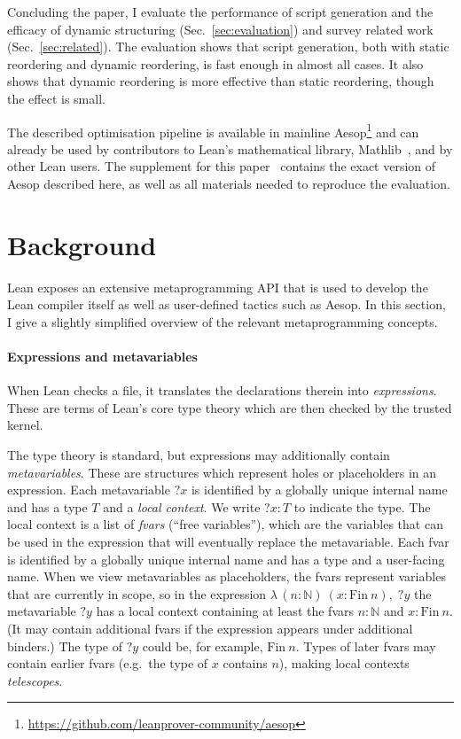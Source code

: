 \documentclass[sigplan,screen]{acmart}
\newcommand{\Lam}[2]{λ\,#1,\; #2}
\newcommand{\mvar}[1]{{?#1}}
\begin{document}
\medskip

Concluding the paper, I evaluate the performance of script generation and the efficacy of dynamic structuring (Sec.~\ref{sec:evaluation}) and survey related work (Sec.~\ref{sec:related}).
The evaluation shows that script generation, both with static reordering and dynamic reordering, is fast enough in almost all cases.
It also shows that dynamic reordering is more effective than static reordering, though the effect is small.

The described optimisation pipeline is available in mainline Aesop\footnote{\url{https://github.com/leanprover-community/aesop}} and can already be used by contributors to Lean's mathematical library, Mathlib~\cite{Mathlib}, and by other Lean users.
The supplement for this paper~\cite{supplement} contains the exact version of Aesop described here, as well as all materials needed to reproduce the evaluation.

\section{Background}%
\label{sec:background}

Lean exposes an extensive metaprogramming API that is used to develop the Lean compiler itself as well as user-defined tactics such as Aesop.
In this section, I give a slightly simplified overview of the relevant metaprogramming concepts.

\paragraph{Expressions and metavariables}
When Lean checks a file, it translates the declarations therein into \emph{expressions}.
These are terms of Lean's core type theory which are then checked by the trusted kernel.

The type theory is standard, but expressions may additionally contain \emph{metavariables}.
These are structures which represent holes or placeholders in an expression.
Each metavariable $\mvar{x}$ is identified by a globally unique internal name and has a type $T$ and a \emph{local context}.
We write $\mvar{x} : T$ to indicate the type.
The local context is a list of \emph{fvars} (\enquote{free variables}), which are the variables that can be used in the expression that will eventually replace the metavariable.
Each fvar is identified by a globally unique internal name and has a type and a user-facing name.
When we view metavariables as placeholders, the fvars represent variables that are currently in scope, so in the expression $\Lam{(n : ℕ)~(x : \mathrm{Fin}~n)}{\mvar{y}}$ the metavariable $\mvar{y}$ has a local context containing at least the fvars $n : ℕ$ and $x : \mathrm{Fin}~n$.
(It may contain additional fvars if the expression appears under additional binders.)
The type of $\mvar{y}$ could be, for example, $\mathrm{Fin}~n$.
Types of later fvars may contain earlier fvars (e.g.\ the type of $x$ contains $n$), making local contexts \emph{telescopes}.
\end{document}
